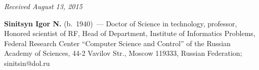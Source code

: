 \vspace*{-6pt}

\hfill{\small\textit{Received August 13, 2015}}

\vspace*{-12pt}
    

\Contrl

\noindent
\textbf{Sinitsyn Igor N.} (b.\ 1940)~---
Doctor of Science in technology, professor,
Honored scientist of RF, Head of Department, 
Institute of Informatics Problems, 
Federal Research Center ``Computer Science and
Control'' of the Russian Academy of Sciences, 44-2 Vavilov Str.,
Moscow 119333, Russian Federation; sinitsin@dol.ru

 \label{end\stat}


\renewcommand{\bibname}{\protect\rm Литература}